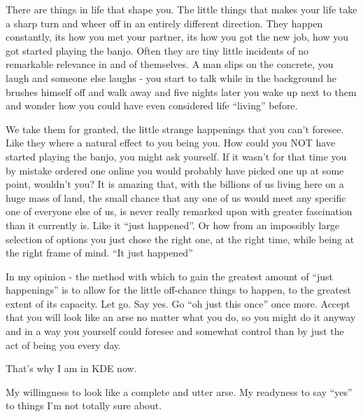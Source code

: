

\noindent{}There are things in life that shape you. The little things that makes your life take a sharp turn and wheer off in an entirely different direction. 
They happen constantly, its how you met your partner, its how you got the new job, how you got started playing the banjo. Often they are tiny little incidents of no remarkable relevance in and of themselves. A man slips on the concrete, you laugh and someone else laughs - you start to talk while in the background he brushes himself off and walk away and five nights later you wake up next to them and wonder how you could have even considered life “living” before.

We take them for granted, the little strange happenings that you can’t foresee. Like they where a natural effect to you being you. How could you NOT have started playing the banjo, you might ask yourself. If it wasn’t for that time you by mistake ordered one online you would probably have picked one up at some point, wouldn’t you? 
It is amazing that, with the billions of us living here on a huge mass of land, the small chance that any one of us would meet any specific one of everyone else of us, is never really remarked upon with greater fascination than it currently is. Like it “just happened”.  Or how from an impossibly large selection of options you just chose the right one, at the right time, while being at the right frame of mind. “It just happened”

In my opinion - the method with which to gain the greatest amount of “just happenings” is to allow for the little off-chance things to happen, to the greatest extent of its capacity. Let go. Say yes. Go “oh just this once” once more. Accept that you will look like an arse no matter what you do, so you might do it anyway and in a way you yourself could foresee and somewhat control than by just the act of being you every day. 

That's why I am in KDE now.

My willingness to look like a complete and utter arse. My readyness to say “yes” to things I’m not totally sure about.

